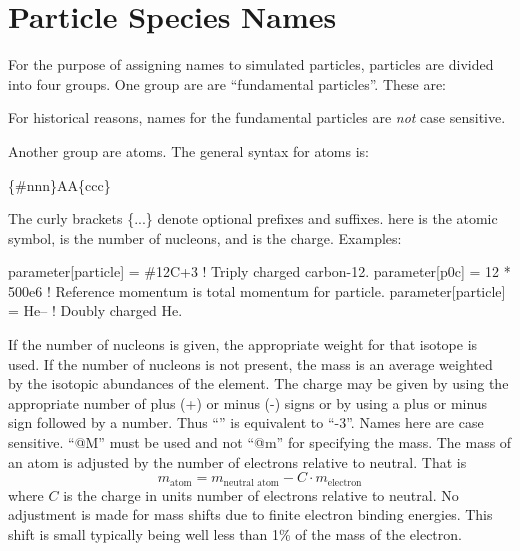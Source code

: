 {{{{{\section{Particle Species Names}
\label{s:species.name}

For the purpose of assigning names to simulated particles, particles are divided into four
groups. One group are are ``fundamental particles''. These are:
For historical reasons, names for the fundamental particles are {\em not} case sensitive.

Another group are atoms. The general syntax for atoms is:
\begin{example}
  \{\#nnn\}AA\{ccc\}
\end{example}
The curly brackets \{...\} denote optional prefixes and suffixes.  here is the
atomic symbol,  is the number of nucleons, and  is the charge. Examples:
\begin{example}
  parameter[particle] = \#12C+3       ! Triply charged carbon-12.
  parameter[p0c] = 12 * 500e6         ! Reference momentum is total momentum for particle.
  parameter[particle] = He--          ! Doubly charged He.
\end{example}
If the number of nucleons is given, the appropriate weight for that isotope is used. If the number
of nucleons is not present, the mass is an average weighted by the isotopic abundances of the
element. The charge may be given by using the appropriate number of plus (+) or minus (-) signs or
by using a plus or minus sign followed by a number. Thus ``\vn{-{-}-}'' is equivalent to
``-3''. Names here are case sensitive. ``@M'' must be used and not ``@m'' for specifying the mass.
The mass of an atom is adjusted by the number of electrons relative to neutral. That is
\begin{equation}
  m_{\mbox{atom}} = m_{\mbox{neutral atom}} - C \cdot m_{\mbox{electron}}
\end{equation}
where $C$ is the charge in units number of electrons relative to neutral. No adjustment is made for
mass shifts due to finite electron binding energies. This shift is small typically being well less
than 1\% of the mass of the electron.

}}}}}

